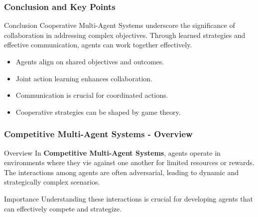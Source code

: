\documentclass[aspectratio=169]{beamer}
\begin{document}
\begin{frame}[fragile]
    \frametitle{Conclusion and Key Points}
    \begin{block}{Conclusion}
        Cooperative Multi-Agent Systems underscore the significance of collaboration in addressing complex objectives. Through learned strategies and effective communication, agents can work together effectively.
    \end{block}
    \begin{itemize}
        \item Agents align on shared objectives and outcomes.
        \item Joint action learning enhances collaboration.
        \item Communication is crucial for coordinated actions.
        \item Cooperative strategies can be shaped by game theory.
    \end{itemize}
\end{frame}

\begin{frame}[fragile]
    \frametitle{Competitive Multi-Agent Systems - Overview}
    \begin{block}{Overview}
        In \textbf{Competitive Multi-Agent Systems}, agents operate in environments where they vie against one another for limited resources or rewards. The interactions among agents are often adversarial, leading to dynamic and strategically complex scenarios.
    \end{block}
    \begin{block}{Importance}
        Understanding these interactions is crucial for developing agents that can effectively compete and strategize.
    \end{block}
\end{frame}
\end{document}
